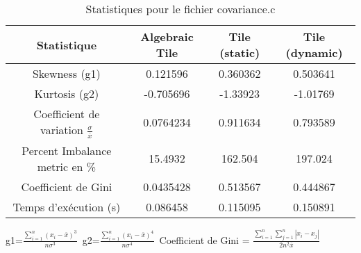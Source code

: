 \documentclass{article}
\begin{document}
\begin{table}[htbp]
  \centering
  \caption{Statistiques pour le fichier covariance.c}
  \begin{tabular}{|c|c|c|c|}
    \hline
    Statistique & Algebraic Tile & Tile (static) & Tile (dynamic) \\ 
    \hline
    Skewness (g1)  & 0.121596 & 0.360362 & 0.503641 \\ 
    Kurtosis (g2)  & -0.705696 & -1.33923 & -1.01769 \\ 
    Coefficient de variation $ \frac{\sigma}{\overline{x}} $ & 0.0764234 & 0.911634 & 0.793589\\ 
    Percent Imbalance metric en \% & 15.4932 & 162.504 & 197.024\\ 
    Coefficient de Gini  & 0.0435428 & 0.513567 & 0.444867\\ 
    Temps d'exécution (s) &  0.086458 &  0.115095   &  0.150891   \\ 

    \hline
  \end{tabular}
\end{table}
g1=$ \frac{\sum_{i=1}^{n} (x_i - \overline{x})^3}{n\sigma^3} $\
g2=$ \frac{\sum_{i=1}^{n} (x_i - \overline{x})^4}{n\sigma^4} $\
Coefficient de Gini = $ \frac{\sum_{i=1}^{n}\sum_{j=1}^{n} |x_i - x_j|}{2n^2\overline{x}} $\
\newpage

  
\end{document}
